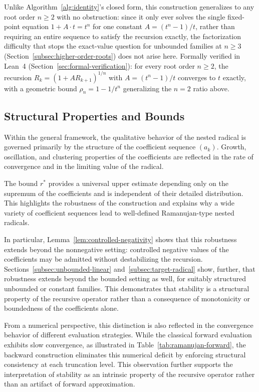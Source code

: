 \documentclass[11pt,a4paper]{amsart}
\theoremstyle{plain}
\theoremstyle{definition}
\theoremstyle{remark}
\begin{document}
Unlike Algorithm~\ref{alg:identity}'s closed form, this construction generalizes to any root order $n\ge 2$ with no obstruction: since it only ever solves the single fixed-point equation $1+A\cdot t=t^n$ for one constant $A=(t^n-1)/t$, rather than requiring an entire sequence to satisfy the recursion exactly, the factorization difficulty that stops the exact-value question for unbounded families at $n\ge 3$ (Section~\ref{subsec:higher-order-roots}) does not arise here. Formally verified in Lean~4 (Section~\ref{sec:formal-verification}): for every root order $n\ge 2$, the recursion $R_k=(1+A R_{k+1})^{1/n}$ with $A=(t^n-1)/t$ converges to $t$ exactly, with a geometric bound $\rho_n = 1-1/t^n$ generalizing the $n=2$ ratio above.

\subsection{Structural Properties and Bounds}
\label{subsec:structural-bounds}

Within the general framework, the qualitative behavior of the nested radical is governed primarily by the structure of the coefficient sequence $(a_k)$. Growth, oscillation, and clustering properties of the coefficients are reflected in the rate of convergence and in the limiting value of the radical.

The bound $r^{\ast}$ provides a universal upper estimate depending only on the supremum of the coefficients and is independent of their detailed distribution. This highlights the robustness of the construction and explains why a wide variety of coefficient sequences lead to well-defined Ramanujan-type nested radicals.

In particular, Lemma~\ref{lem:controlled-negativity} shows that this robustness extends beyond the nonnegative setting: controlled negative values of the coefficients may be admitted without destabilizing the recursion. Sections~\ref{subsec:unbounded-linear} and~\ref{subsec:target-radical} show, further, that robustness extends beyond the bounded setting as well, for suitably structured unbounded or constant families. This demonstrates that stability is a structural property of the recursive operator rather than a consequence of monotonicity or boundedness of the coefficients alone.

From a numerical perspective, this distinction is also reflected in the convergence behavior of different evaluation strategies. While the classical forward evaluation exhibits slow convergence, as illustrated in Table~\ref{tab:ramanujan-forward}, the backward construction eliminates this numerical deficit by enforcing structural consistency at each truncation level. This observation further supports the interpretation of stability as an intrinsic property of the recursive operator rather than an artifact of forward approximation.
\end{document}
